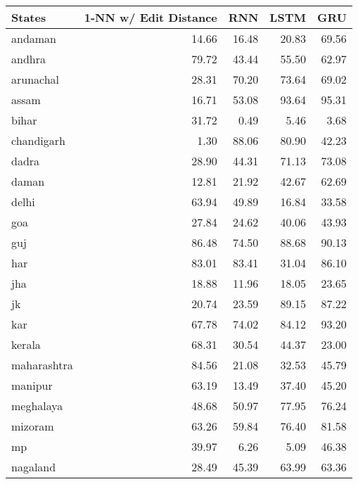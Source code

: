 \begin{table}
\centering
\label{si_tab}
\begin{tabular}{lrrrr}
\toprule
     States &  1-NN w/ Edit Distance &   RNN &  LSTM &   GRU \\
\midrule
    andaman &                  14.66 & 16.48 & 20.83 & 69.56 \\
     andhra &                  79.72 & 43.44 & 55.50 & 62.97 \\
  arunachal &                  28.31 & 70.20 & 73.64 & 69.02 \\
      assam &                  16.71 & 53.08 & 93.64 & 95.31 \\
      bihar &                  31.72 &  0.49 &  5.46 &  3.68 \\
 chandigarh &                   1.30 & 88.06 & 80.90 & 42.23 \\
      dadra &                  28.90 & 44.31 & 71.13 & 73.08 \\
      daman &                  12.81 & 21.92 & 42.67 & 62.69 \\
      delhi &                  63.94 & 49.89 & 16.84 & 33.58 \\
        goa &                  27.84 & 24.62 & 40.06 & 43.93 \\
        guj &                  86.48 & 74.50 & 88.68 & 90.13 \\
        har &                  83.01 & 83.41 & 31.04 & 86.10 \\
        jha &                  18.88 & 11.96 & 18.05 & 23.65 \\
         jk &                  20.74 & 23.59 & 89.15 & 87.22 \\
        kar &                  67.78 & 74.02 & 84.12 & 93.20 \\
     kerala &                  68.31 & 30.54 & 44.37 & 23.00 \\
maharashtra &                  84.56 & 21.08 & 32.53 & 45.79 \\
    manipur &                  63.19 & 13.49 & 37.40 & 45.20 \\
  meghalaya &                  48.68 & 50.97 & 77.95 & 76.24 \\
    mizoram &                  63.26 & 59.84 & 76.40 & 81.58 \\
         mp &                  39.97 &  6.26 &  5.09 & 46.38 \\
   nagaland &                  28.49 & 45.39 & 63.99 & 63.36 \\
\bottomrule
\end{tabular}
\end{table}

